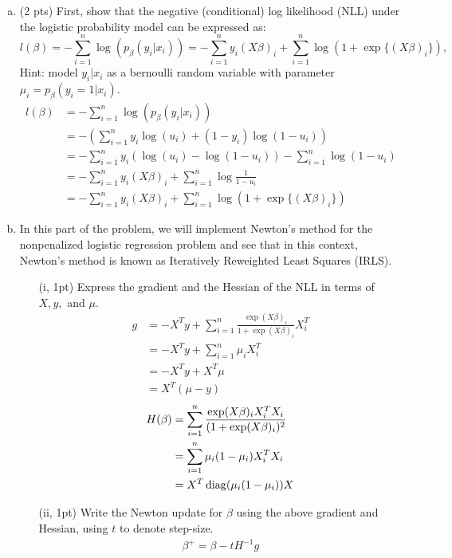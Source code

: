 \documentclass{article}
\theoremstyle{remark}
\theoremstyle{definition}
\newcommand{\diag}{\mathop{\rm diag}}
\begin{document}
\begin{enumerate}[(a)]
    \item (2 pts) First, show that the negative (conditional) log likelihood (NLL) under the logistic probability model can be expressed as: 
  \[
    l(\beta) = -\sum_{i=1}^{n} \log(p_{\beta}(y_i | x_i)) = -\sum_{i=1}^{n}y_i(X\beta)_i + \sum_{i=1}^{n}\log(1 +
    \exp\{(X\beta)_i\}),
  \]
    Hint: model $y_i|x_i$ as a bernoulli random variable with parameter $\mu_i = p_{\beta}(y_i = 1|x_i)$.
  {
  \color{blue}
  \begin{align*}
      l(\beta)&=-\sum_{i=1}^n\log (p_\beta (y_i|x_i)) \\
      &= -(\sum_{i=1}^n y_i\log (u_i) + (1-y_i)\log (1-u_i)) \\
      &= - \sum_{i=1}^n y_i(\log(u_i)-\log(1-u_i)) - \sum_{i=1}^n\log (1-u_i) \\
      &= - \sum_{i=1}^{n}y_i(X\beta)_i + \sum_{i=1}^n\log \frac{1}{1-u_i} \\
      &= -\sum_{i=1}^{n}y_i(X\beta)_i + \sum_{i=1}^{n}\log(1 + \exp\{(X\beta)_i\})
  \end{align*}
  }
    \item In this part of the problem, we will implement Newton's method for the nonpenalized logistic regression problem and see that in this context, Newton's method is known as Iteratively Reweighted Least Squares (IRLS).
        \begin{enumerate}
    	\item[(i, 1pt)] Express the gradient and the Hessian of the NLL in terms of $X,y,$ and $\mu$.
    	{
    	\color{blue}
    	\begin{align*}
    	    g &= - X^Ty + \sum_{i=1}^n \frac{\exp (X\beta)_i}{1+\exp (X\beta)_i}X_i^T \\
    	    &=-X^Ty + \sum_{i=1}^n \mu_i X_i^T \\
    	    &= -X^T y + X^T \mu \\
    	    &= X^T(\mu-y)
    	\end{align*}
    	\begin{align*}
    	    H(\beta) &= \sum_{i=1}^n\frac{\exp(X\beta)_iX_i^T X_i}{(1+\exp(X\beta)_i)^2} \\
    	    &=\sum_{i=1}^n \mu_i(1-\mu_i) X_i^T X_i \\
    	    &= X^T\diag(\mu_i(1-\mu_i)) X
    	\end{align*}
    	}
    	\item[(ii, 1pt)] Write the Newton update for $\beta$ using the above gradient and Hessian, using $t$ to denote step-size.
    	{
    	\color{blue}
    	\begin{align*}
    	    \beta^+=\beta - t H^{-1}g
    	\end{align*}
    	}
    	

\end{enumerate}
\end{enumerate}
\end{document}
